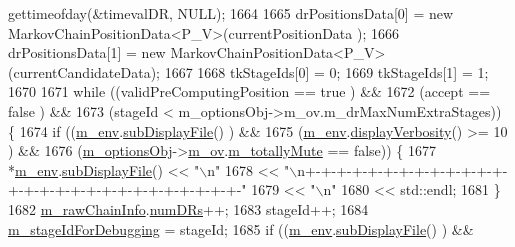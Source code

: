 \begin{DoxyCode}
      gettimeofday(&timevalDR, NULL);
1664 
1665         drPositionsData[0] = \textcolor{keyword}{new} MarkovChainPositionData<P\_V>(currentPositionData );
1666         drPositionsData[1] = \textcolor{keyword}{new} MarkovChainPositionData<P\_V>(currentCandidateData);
1667 
1668         tkStageIds[0] = 0;
1669         tkStageIds[1] = 1;
1670 
1671         \textcolor{keywordflow}{while} ((validPreComputingPosition == \textcolor{keyword}{true}                 ) &&
1672                (accept                    == false                ) &&
1673                (stageId < m\_optionsObj->m\_ov.m\_drMaxNumExtraStages)) \{
1674           \textcolor{keywordflow}{if} ((\hyperlink{class_q_u_e_s_o_1_1_metropolis_hastings_s_g_ac8ea061e55b920e0c8f9bce5c3f20e52}{m\_env}.\hyperlink{class_q_u_e_s_o_1_1_base_environment_a8a0064746ae8dddfece4229b9ad374d6}{subDisplayFile}()                   ) &&
1675               (\hyperlink{class_q_u_e_s_o_1_1_metropolis_hastings_s_g_ac8ea061e55b920e0c8f9bce5c3f20e52}{m\_env}.\hyperlink{class_q_u_e_s_o_1_1_base_environment_a1fe5f244fc0316a0ab3e37463f108b96}{displayVerbosity}() >= 10           ) &&
1676               (\hyperlink{class_q_u_e_s_o_1_1_metropolis_hastings_s_g_a5d0bc9f73d50d272aa6bfb5ef5939ef3}{m\_optionsObj}->\hyperlink{class_q_u_e_s_o_1_1_metropolis_hastings_s_g_options_a9d4792d9fc2dc5439b8ab489b0c236eb}{m\_ov}.\hyperlink{class_q_u_e_s_o_1_1_mh_options_values_af812309e81191e88dfdc87c5815141a3}{m\_totallyMute} == \textcolor{keyword}{false})) \{
1677             *\hyperlink{class_q_u_e_s_o_1_1_metropolis_hastings_s_g_ac8ea061e55b920e0c8f9bce5c3f20e52}{m\_env}.\hyperlink{class_q_u_e_s_o_1_1_base_environment_a8a0064746ae8dddfece4229b9ad374d6}{subDisplayFile}() << \textcolor{stringliteral}{"\(\backslash\)n"}
1678                                     << \textcolor{stringliteral}{"\(\backslash\)n+-+-+-+-+-+-+-+-+-+-+-+-+-+-+-+-+-+-+-+-+-+-+-+-+-+-+-+-"}
1679                                     << \textcolor{stringliteral}{"\(\backslash\)n"}
1680                                     << std::endl;
1681           \}
1682           \hyperlink{class_q_u_e_s_o_1_1_metropolis_hastings_s_g_ac531509489028853bb17c0353fc9eafd}{m\_rawChainInfo}.\hyperlink{struct_q_u_e_s_o_1_1_m_h_raw_chain_info_struct_a993b070bd796dd176f4168be05f11ce9}{numDRs}++;
1683           stageId++;
1684           \hyperlink{class_q_u_e_s_o_1_1_metropolis_hastings_s_g_aca9351ab468808759b8b19686231ae4f}{m\_stageIdForDebugging} = stageId;
1685           \textcolor{keywordflow}{if} ((\hyperlink{class_q_u_e_s_o_1_1_metropolis_hastings_s_g_ac8ea061e55b920e0c8f9bce5c3f20e52}{m\_env}.\hyperlink{class_q_u_e_s_o_1_1_base_environment_a8a0064746ae8dddfece4229b9ad374d6}{subDisplayFile}()                   ) &&

\end{DoxyCode}
